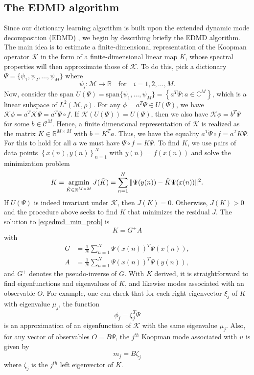 \documentclass[%
 aip,
 cha,
 sd,%
 amsmath,amssymb,
 preprint,%
]{revtex4-1}
\begin{document}
\subsection{The EDMD algorithm}
Since our dictionary learning algorithm is built upon the extended dynamic mode decomposition (EDMD) \cite{williams2015data}, we begin by describing briefly the EDMD algorithm. The main idea is to estimate a finite-dimensional representation of the Koopman operator $\mathcal{K}$ in the form of a finite-dimensional linear map $K$, whose spectral properties will then approximate those of $\mathcal{K}$. To do this, pick a dictionary $\Psi = \{\psi_{1}, \psi_{2}, \dots, \psi_{M}\}$ where
\[
\psi_{i}: \mathcal{M} \rightarrow \mathbb{R} \quad \text{for} \quad i=1,2,\dots,M.
\]
Now, consider the span $U(\Psi)=\text{span}\{\psi_1,\dots,\psi_M\}=\left\{a^T \Psi :a\in\mathbb{C}^M \right\}$, which is a linear subspace of $L^2(\mathcal{M},\rho)$. For any $\phi= a^T \Psi \in U(\Psi)$, we have 
$\mathcal{K}\phi = a^T \mathcal{K}\Psi = a^T \Psi\circ f$.
If $\mathcal{K}(U(\Psi))=U(\Psi)$, then we also have $\mathcal{K}\phi = b^T \Psi$ for some $b\in\mathcal{C}^M$. Hence, a finite dimensional representation of $\mathcal{K}$ is realized as the matrix $K\in\mathbb{R}^{M\times M}$ with $b = K^T a$. Thus, we have the equality $a^T\Psi\circ f=a^T K\Psi$. For this to hold for all $a$ we must have $\Psi\circ f = K\Psi$. To find $K$, we use pairs of data points $\left\{ x(n),y(n)\right\} _{n=1}^{N}$ with $y(n)=f\left(x(n)\right)$ and solve the minimization problem
\begin{equation}
K = \operatornamewithlimits{arg min}_{\tilde{K}\in\mathbb{R}^{M\times M}} J(\tilde{K}) = \sum_{n=1}^{N} {\Vert \Psi(y(n)) - \tilde{K}\Psi(x(n)) \Vert^2}.
\label{eq:edmd_min_prob}
\end{equation}
If $U(\Psi)$ is indeed invariant under $\mathcal{K}$, then $J(K)=0$. Otherwise, $J(K)>0$ and the procedure above seeks to find $K$ that minimizes the residual $J$. The solution to \eqref{eq:edmd_min_prob} is
\[
K = G^{+} A
\]
with
\begin{align}
	G &= \frac{1}{N}\sum_{n=1}^{N}\Psi\left(x(n)\right)^{T}\Psi\left(x(n)\right), \nonumber\\
	A &= \frac{1}{N}\sum_{n=1}^{N}\Psi\left(x(n)\right)^{T}\Psi\left(y(n)\right), 
	\label{eq:GA}
\end{align}
and $G^{+}$ denotes the pseudo-inverse of $G$.
With $K$ derived, it is straightforward to find eigenfunctions and eigenvalues of $K$, and likewise modes associated with an observable $O$. 
For example, one can check that for each right eigenvector $\xi_{j}$ of $K$ with eigenvalue $\mu_{j}$, the function
\[
\phi_{j}=\xi_{j}^{T}\Psi
\]
is an approximation of an eigenfunction of $\mathcal{K}$ with the same eigenvalue $\mu_j$. Also, for any vector of observables $O=B\Psi$, the $j^{th}$ Koopman mode associated with $u$ is given by 
\[
m_j = B\zeta_j
\]
where $\zeta_j$ is the $j^{th}$ left eigenvector of $K$. 
\end{document}
